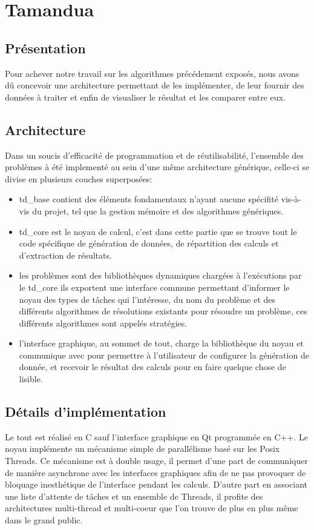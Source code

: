 \chapter{Tamandua}
\section{Présentation}
Pour achever notre travail sur les algorithmes précédement exposés, nous avons
dû concevoir une architecture permettant de les implémenter, de leur fournir des
données à traiter et enfin de visualiser le résultat et les comparer entre eux.
\section{Architecture}
Dans un soucis d'efficacité de programmation et de réutilisabilité, l'ensemble
des problèmes à été implementé au sein d'une même architecture générique, celle-ci
se divise en plusieurs couches superposées:
\begin{itemize}
   \item td\_base contient des éléments fondamentaux n'ayant aucune spécifité
   vis-à-vis du projet, tel que la gestion mémoire et des algorithmes génériques.
   \item td\_core est le noyau de calcul, c'est dans cette partie que se trouve
   tout le code spécifique de génération de données, de répartition des calculs
   et d'extraction de résultats.
   \item les problèmes sont des bibliothèques dynamiques chargées à l'exécutions
   par le td\_core ils exportent une interface commune permettant d'informer le
   noyau des types de tâches qui l'intéresse, du nom du problème et des
   différents algorithmes de résolutions existants pour résoudre un problème,
   ces différents algorithmes sont appelés stratégies.
   \item l'interface graphique, au sommet de tout, charge la bibliothèque du 
   noyau et communique avec pour permettre à l'utilisateur de configurer la
   génération de donnée, et recevoir le résultat des calculs pour en faire
   quelque chose de lisible.
\end{itemize}
\section{Détails d'implémentation}
Le tout est réalisé en C sauf l'interface graphique en Qt programmée en C++.
Le noyau implémente un mécanisme simple de parallélisme basé sur les Posix Threads.
Ce mécanisme est à double usage, il permet d'une part de communiquer de manière
asynchrone avec les interfaces graphiques afin de ne pas provoquer de bloquage
inesthétique de l'interface pendant les calculs. D'autre part en associant une
liste d'attente de tâches et un ensemble de Threads, il profite des architectures
multi-thread et multi-coeur que l'on trouve de plus en plus même dans le grand
public.

